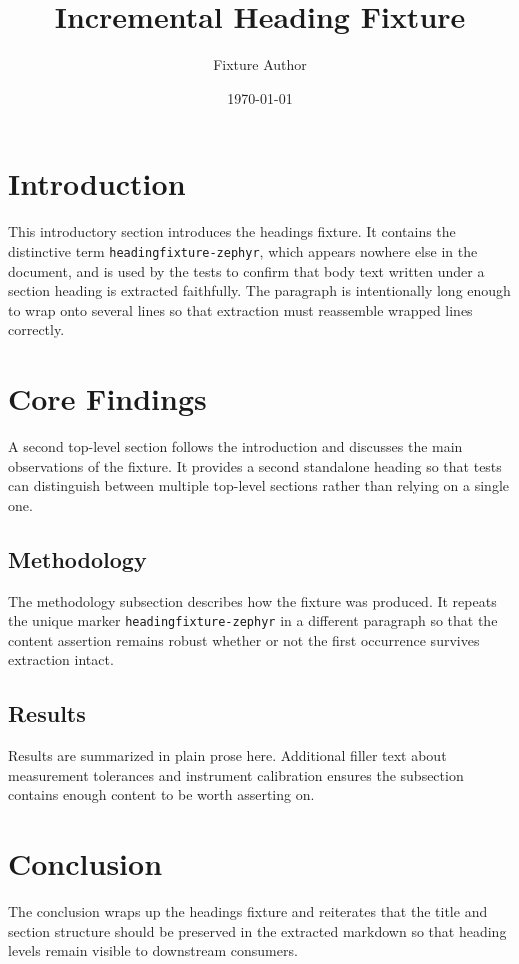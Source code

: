\documentclass{article}
\title{Incremental Heading Fixture}
\author{Fixture Author}
\date{\today}
\begin{document}
\maketitle

\section{Introduction}
This introductory section introduces the headings fixture. It contains the
distinctive term \texttt{headingfixture-zephyr}, which appears nowhere else in
the document, and is used by the tests to confirm that body text written under
a section heading is extracted faithfully. The paragraph is intentionally long
enough to wrap onto several lines so that extraction must reassemble wrapped
lines correctly.

\section{Core Findings}
A second top-level section follows the introduction and discusses the main
observations of the fixture. It provides a second standalone heading so that
tests can distinguish between multiple top-level sections rather than relying
on a single one.

\subsection{Methodology}
The methodology subsection describes how the fixture was produced. It repeats
the unique marker \texttt{headingfixture-zephyr} in a different paragraph so
that the content assertion remains robust whether or not the first occurrence
survives extraction intact.

\subsection{Results}
Results are summarized in plain prose here. Additional filler text about
measurement tolerances and instrument calibration ensures the subsection
contains enough content to be worth asserting on.

\section{Conclusion}
The conclusion wraps up the headings fixture and reiterates that the title and
section structure should be preserved in the extracted markdown so that heading
levels remain visible to downstream consumers.
\end{document}
